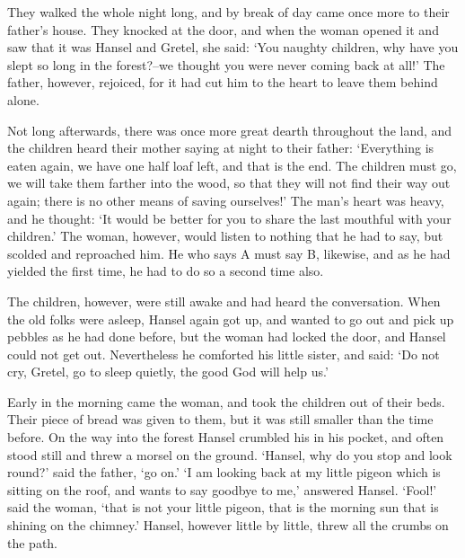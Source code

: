 They walked the whole night long, and by break of day came once more to their father's house. They knocked at the door, and when the woman opened it and saw that it was Hansel and Gretel, she said: `You naughty children, why have you slept so long in the forest?--we thought you were never coming back at all!' The father, however, rejoiced, for it had cut him to the heart to leave them behind alone.

Not long afterwards, there was once more great dearth throughout the land, and the children heard their mother saying at night to their father: `Everything is eaten again, we have one half loaf left, and that is the end. The children must go, we will take them farther into the wood, so that they will not find their way out again; there is no other means of saving ourselves!' The man's heart was heavy, and he thought: `It would be better for you to share the last mouthful with your children.' The woman, however, would listen to nothing that he had to say, but scolded and reproached him. He who says A must say B, likewise, and as he had yielded the first time, he had to do so a second time also.

The children, however, were still awake and had heard the conversation. When the old folks were asleep, Hansel again got up, and wanted to go out and pick up pebbles as he had done before, but the woman had locked the door, and Hansel could not get out. Nevertheless he comforted his little sister, and said: `Do not cry, Gretel, go to sleep quietly, the good God will help us.'

Early in the morning came the woman, and took the children out of their beds. Their piece of bread was given to them, but it was still smaller than the time before. On the way into the forest Hansel crumbled his in his pocket, and often stood still and threw a morsel on the ground. `Hansel, why do you stop and look round?' said the father, `go on.' `I am looking back at my little pigeon which is sitting on the roof, and wants to say goodbye to me,' answered Hansel. `Fool!' said the woman, `that is not your little pigeon, that is the morning sun that is shining on the chimney.' Hansel, however little by little, threw all the crumbs on the path.

